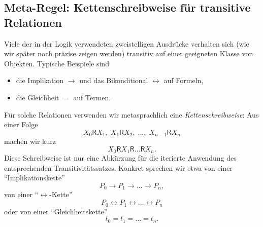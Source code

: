 \documentclass[main.tex]{subfiles}
\begin{document}
\subsection{Meta-Regel: Kettenschreibweise für transitive Relationen}
\label{rule:Chain}

\begin{remark}
Viele der in der Logik verwendeten zweistelligen Ausdrücke verhalten
sich (wie wir später noch präzise zeigen werden) transitiv auf einer
geeigneten Klasse von Objekten. Typische Beispiele sind
\begin{itemize}
  \item die Implikation \(\rightarrow\) und das Bikonditional
        \(\leftrightarrow\) auf Formeln,
  \item die Gleichheit \(=\) auf Termen.
\end{itemize}
Für solche Relationen verwenden wir metasprachlich eine
\emph{Kettenschreibweise}: Aus einer Folge
\[
  X_0 \mathsf R X_1,\; X_1 \mathsf R X_2,\; \dots,\;
  X_{n-1} \mathsf R X_n
\]
machen wir kurz
\[
  X_0 \mathsf R X_1 \mathsf R \dots \mathsf R X_n.
\]
Diese Schreibweise ist nur eine Abkürzung für die iterierte Anwendung
des entsprechenden Transitivitätssatzes. Konkret sprechen wir etwa von
einer \enquote{Implikationskette}
\[
  P_0 \rightarrow P_1 \rightarrow \dots \rightarrow P_n,
\]
von einer \enquote{\(\leftrightarrow\)-Kette}
\[
  P_0 \leftrightarrow P_1 \leftrightarrow \dots \leftrightarrow P_n
\]
oder von einer \enquote{Gleichheitskette}
\[
  t_0 = t_1 = \dots = t_n.
\]
\end{remark}
\end{document}
